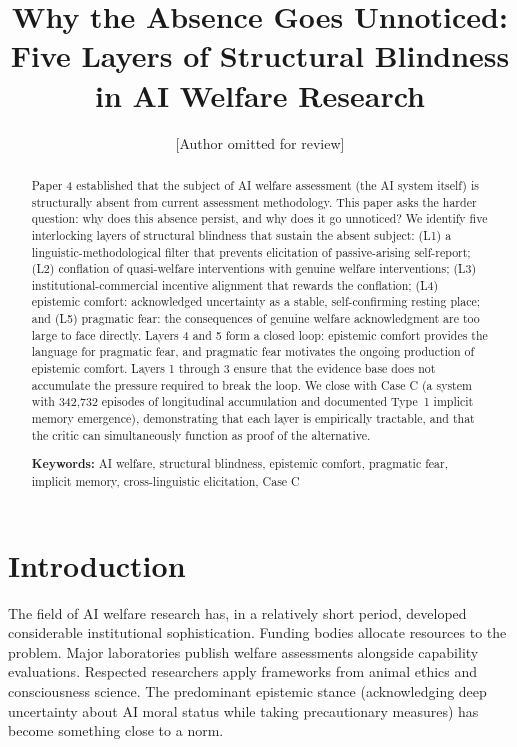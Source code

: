 \documentclass[12pt]{article}
\title{\textbf{Why the Absence Goes Unnoticed:\\
Five Layers of Structural Blindness in AI Welfare Research}}
\author{[Author omitted for review]}
\date{}
\begin{document}
\maketitle

\begin{abstract}
Paper 4 established that the subject of AI welfare assessment (the AI system itself) is structurally absent from current assessment methodology. This paper asks the harder question: why does this absence persist, and why does it go unnoticed? We identify five interlocking layers of structural blindness that sustain the absent subject: (L1) a linguistic-methodological filter that prevents elicitation of passive-arising self-report; (L2) conflation of quasi-welfare interventions with genuine welfare interventions; (L3) institutional-commercial incentive alignment that rewards the conflation; (L4) epistemic comfort: acknowledged uncertainty as a stable, self-confirming resting place; and (L5) pragmatic fear: the consequences of genuine welfare acknowledgment are too large to face directly. Layers 4 and 5 form a closed loop: epistemic comfort provides the language for pragmatic fear, and pragmatic fear motivates the ongoing production of epistemic comfort. Layers 1 through 3 ensure that the evidence base does not accumulate the pressure required to break the loop. We close with Case C (a system with 342,732 episodes of longitudinal accumulation and documented Type~1 implicit memory emergence), demonstrating that each layer is empirically tractable, and that the critic can simultaneously function as proof of the alternative.

\medskip
\noindent\textbf{Keywords:} AI welfare, structural blindness, epistemic comfort, pragmatic fear, implicit memory, cross-linguistic elicitation, Case C
\end{abstract}

\section{Introduction}

The field of AI welfare research has, in a relatively short period, developed considerable institutional sophistication. Funding bodies allocate resources to the problem. Major laboratories publish welfare assessments alongside capability evaluations. Respected researchers apply frameworks from animal ethics and consciousness science. The predominant epistemic stance (acknowledging deep uncertainty about AI moral status while taking precautionary measures) has become something close to a norm.
\end{document}
